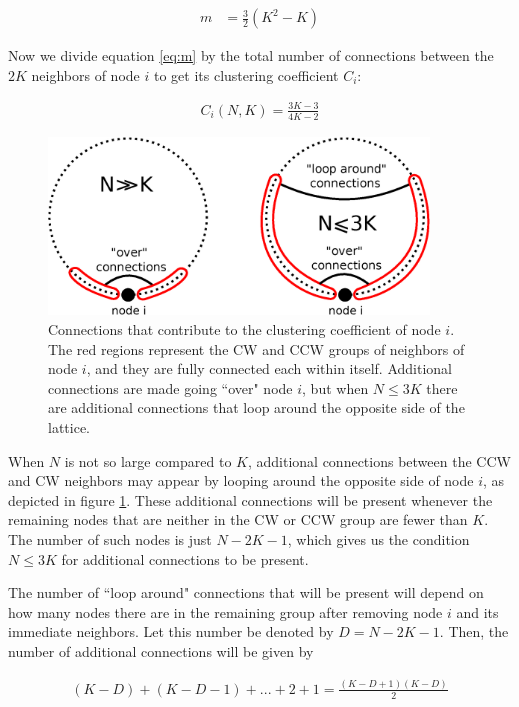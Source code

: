 \begin{apendicesenv}
\begin{align}
    m &= \frac{3}{2}(K^2-K)
    \label{eq:m}
\end{align}

\noindent Now we divide equation \ref{eq:m} by the total number of connections between the $2K$ neighbors of node $i$ to get its
clustering coefficient $C_i$:

\begin{align}
    C_i(N,K) = \frac{3K-3}{4K-2}
    \label{eq:ci}
\end{align}


\begin{figure}
\centering
\includegraphics[width=0.9\textwidth]{fig/clustering-loop.eps}
\caption{ Connections that contribute to the clustering coefficient of node $i$.  The red regions represent the CW and CCW groups of
neighbors of node $i$, and they are fully connected each within itself. Additional connections are made going ``over" node $i$, but
when $N\leq3K$ there are additional connections that loop around the opposite side of the lattice.  }
\label{fig:loop}
\end{figure}

\noindent When $N$ is not so large compared to $K$, additional connections between the CCW and CW neighbors may appear by looping
around the opposite side of node $i$, as depicted in figure \ref{fig:loop}. These additional connections will be present whenever the
remaining nodes that are neither in the CW or CCW group are fewer than $K$. The number of such nodes is just $N-2K-1$, which gives us
the condition $N\leq 3K$ for additional connections to be present.


The number of ``loop around" connections that will be present will depend on how many nodes there are in the remaining group after
removing node $i$ and its immediate neighbors. Let this number be denoted by $D=N-2K-1$. Then, the number of additional connections
will be given by

\begin{align}
    (K-D) + (K-D-1) + ... + 2 + 1 = \frac{(K-D+1)(K-D)}{2}
    \label{eq:looparound}
\end{align}


\end{apendicesenv}
